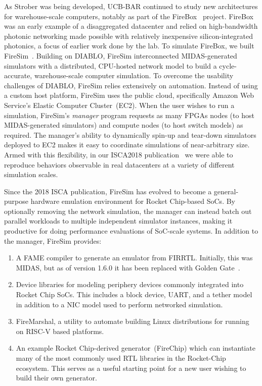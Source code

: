 As Strober was being developed, UCB-BAR continued to study new architectures for
warehouse-scale computers, notably as part of the FireBox~\cite{FireBox} project.
FireBox was an early example of a disaggregated datacenter and relied on
high-bandwidth photonic networking made possible with relatively inexpensive
silicon-integrated photonics, a focus of earlier work done by the lab.  To
simulate FireBox, we built FireSim~\cite{FireSim}. Building on DIABLO, FireSim interconnected MIDAS-generated
simulators with a distributed, CPU-hosted network model to build a
cycle-accurate, warehouse-scale computer simulation. To overcome the usability
challenges of DIABLO, FireSim relies extensively on automation.  Instead of
using a custom host platform, FireSim uses the public cloud, specifically
Amazon Web Service's Elastic Computer Cluster~(EC2).  When the user wishes to run a simulation, FireSim's \emph{manager} program
requests as many FPGAs nodes (to host
MIDAS-generated simulators) and compute nodes (to host switch models) as required. The manager's ability to dynamically spin-up and tear-down simulators
deployed to EC2 makes it easy to coordinate simulations of near-arbitrary size. Armed with this flexibility, in our
ISCA2018 publication~\cite{FireSim} we were able to reproduce behaviors observable in real
datacenters at a variety of different simulation scales.

Since the 2018 ISCA publication, FireSim has evolved to become a
general-purpose hardware emulation environment for Rocket Chip-based SoCs. By
optionally removing the network simulation, the manager can instead batch out
parallel workloads to multiple independent simulator instances, making it
productive for doing performance evaluations of SoC-scale systems.
In addition to the manager, FireSim provides:
\begin{enumerate}
    \item A FAME compiler to generate an emulator from FIRRTL. Initially, this
        was MIDAS, but as of version 1.6.0 it has been replaced with Golden Gate~\cite{GoldenGate}.
    \item Device libraries for modeling periphery devices commonly integrated
        into Rocket Chip SoCs. This includes a block device, UART,
        and a tether model in addition to a NIC model used to perform networked simulation.
    \item FireMarshal, a utility to automate building Linux distributions for
        running on RISC-V based platforms.
    \item An example Rocket Chip-derived generator~(FireChip) which can instantiate many of the most commonly
        used RTL libraries in the Rocket-Chip ecosystem. This serves as a useful starting point for a new user
        wishing to build their own generator.
\end{enumerate}

